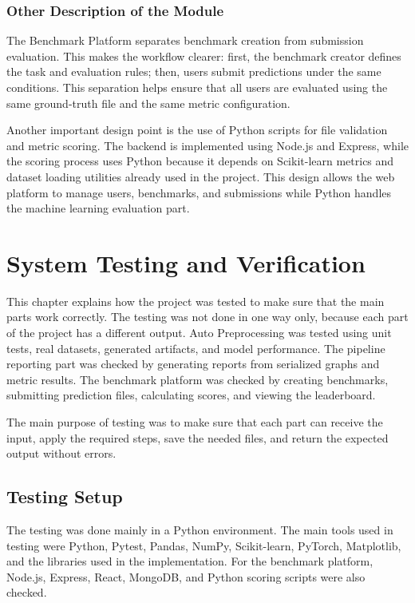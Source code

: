 \documentclass[12pt,a4paper]{report}
\begin{document}
\subsection{Other Description of the Module}
\noindent The Benchmark Platform separates benchmark creation from submission
evaluation. This makes the workflow clearer: first, the benchmark creator
defines the task and evaluation rules; then, users submit predictions under the
same conditions. This separation helps ensure that all users are evaluated
using the same ground-truth file and the same metric configuration.

\noindent Another important design point is the use of Python scripts for file
validation and metric scoring. The backend is implemented using Node.js and
Express, while the scoring process uses Python because it depends on
Scikit-learn metrics and dataset loading utilities already used in the project.
This design allows the web platform to manage users, benchmarks, and
submissions while Python handles the machine learning evaluation part.

\chapter{System Testing and Verification}
This chapter explains how the project was tested to make sure that the main
parts work correctly. The testing was not done in one way only, because each
part of the project has a different output. Auto Preprocessing was tested using
unit tests, real datasets, generated artifacts, and model performance. The
pipeline reporting part was checked by generating reports from serialized
graphs and metric results. The benchmark platform was checked by creating
benchmarks, submitting prediction files, calculating scores, and viewing the
leaderboard.

The main purpose of testing was to make sure that each part can receive the
input, apply the required steps, save the needed files, and return the expected
output without errors.
\section{Testing Setup}
The testing was done mainly in a Python environment. The main tools used in
testing were Python, Pytest, Pandas, NumPy, Scikit-learn, PyTorch, Matplotlib,
and the libraries used in the implementation. For the benchmark platform,
Node.js, Express, React, MongoDB, and Python scoring scripts were also checked.
\end{document}
